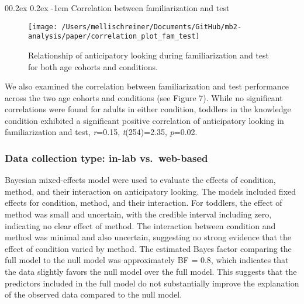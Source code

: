 \documentclass[
  english,
  man,floatsintext]{apa6}
\makeatletter
\let\oldparagraph\paragraph
\renewcommand{\paragraph}[1]{\oldparagraph{#1}\mbox{}}
\renewcommand{\paragraph}{\@startsection{paragraph}{4}{\parindent}%
  {0\baselineskip \@plus 0.2ex \@minus 0.2ex}%
  {-1em}%
  {\normalfont\normalsize\bfseries\itshape\typesectitle}}
\makeatother
\begin{document}
\hypertarget{correlation-between-familiarization-and-test}{%
\paragraph{Correlation between familiarization and test}\label{correlation-between-familiarization-and-test}}

\begin{figure}

{\centering \texttt{[image: /Users/mellischreiner/Documents/GitHub/mb2-analysis/paper/correlation\_plot\_fam\_test]} 

}

\caption{Relationship of anticipatory looking during familiarization and test for both age cohorts and conditions.}\label{fig:fig7}
\end{figure}

We also examined the correlation between familiarization and test performance across the two age cohorts and conditions (see Figure 7). While no significant correlations were found for adults in either condition, toddlers in the knowledge condition exhibited a significant positive correlation of anticipatory looking in familiarization and test, \emph{r}=0.15, \emph{t}(254)=2.35, \emph{p}=0.02.

\hypertarget{data-collection-type-in-lab-vs.-web-based}{%
\subsubsection{Data collection type: in-lab vs.~web-based}\label{data-collection-type-in-lab-vs.-web-based}}

Bayesian mixed-effects model were used to evaluate the effects of condition, method, and their interaction on anticipatory looking. The models included fixed effects for condition, method, and their interaction. For toddlers, the effect of method was small and uncertain, with the credible interval including zero, indicating no clear effect of method. The interaction between condition and method was minimal and also uncertain, suggesting no strong evidence that the effect of condition varied by method. The estimated Bayes factor comparing the full model to the null model was approximately BF = 0.8, which indicates that the data slightly favors the null model over the full model. This suggests that the predictors included in the full model do not substantially improve the explanation of the observed data compared to the null model.
\end{document}
